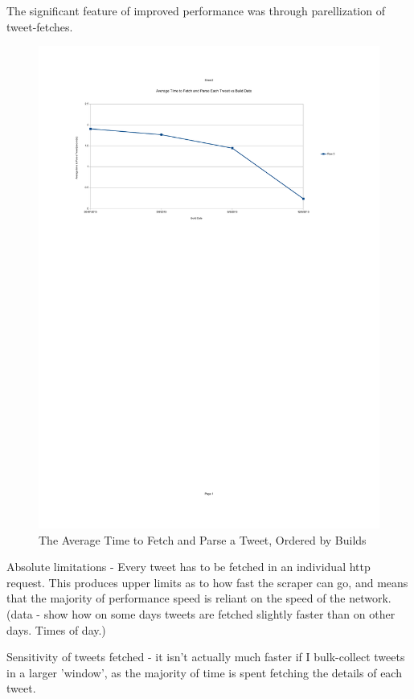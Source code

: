 \noindent The significant feature of improved performance was through parellization of tweet-fetches. 

\begin{figure}[h!]
\centering
\includegraphics{Images/average_time_to_fetch_parse_tweets_per_build.pdf}
\caption{The Average Time to Fetch and Parse a Tweet, Ordered by Builds}
\end{figure}

Absolute limitations - Every tweet has to be fetched in an individual http request. This produces upper limits as to how fast the scraper can go, and means that the majority of performance speed is reliant on the speed of the network. (data - show how on some days tweets are fetched slightly faster than on other days. Times of day.)

Sensitivity of tweets fetched - it isn't actually much faster if I bulk-collect tweets in a larger 'window', as the majority of time is spent fetching the details of each tweet. 

